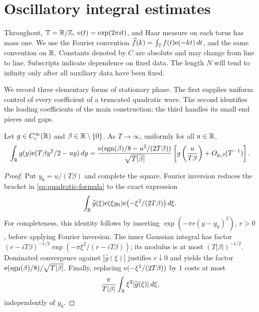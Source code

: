 \section{Oscillatory integral estimates}\label{sec:oscillation}

Throughout, $\mathbb T=\mathbb R/\mathbb Z$, $\mathrm e(t)=\exp(2\pi i t)$, and Haar measure on
each torus has mass one. We use the Fourier convention
$\widehat f(k)=\int_\mathbb T f(t)\mathrm e(-kt)\,dt$, and the same convention on
$\mathbb R$. Constants denoted by $C$ are absolute and may change from line
to line. Subscripts indicate dependence on fixed data. The length
$N$ will tend to infinity only after all auxiliary data have been fixed.

We record three elementary forms of stationary phase. The first supplies
uniform control of every coefficient of a truncated quadratic wave.
The second identifies the leading coefficients of the main construction;
the third handles its small end pieces and gaps.

\begin{lemma}\label{lem:quadratic}
Let $g\in C_c^\infty(\mathbb R)$ and $\beta\in\mathbb R\setminus\{0\}$. As
$T\to\infty$, uniformly for all $u\in\mathbb R$,
\begin{equation}\label{eq:quadratic-formula}
 \int_\mathbb R g(y)\mathrm e(T\beta y^2/2-uy)\,dy
 =\frac{\mathrm e(\operatorname{sgn}(\beta)/8-u^2/(2T\beta))}{\sqrt{T|\beta|}}
   \left[g\left(\frac{u}{T\beta}\right)+O_{g,\beta}(T^{-1})\right].
\end{equation}
\end{lemma}
\begin{proof}
Put $y_0=u/(T\beta)$ and complete the square. Fourier inversion reduces
the bracket in \eqref{eq:quadratic-formula} to the exact expression
\[
 \int_\mathbb R \widehat g(\xi)\mathrm e(\xi y_0)
                     \mathrm e\bigl(-\xi^2/(2T\beta)\bigr)\,d\xi.
\]
For completeness, this identity follows by inserting
$\exp(-\pi r(y-y_0)^2)$, $r>0$, before applying Fourier inversion.
The inner Gaussian integral has factor
$(r-iT\beta)^{-1/2}\exp(-\pi\xi^2/(r-iT\beta))$;
its modulus is at most $(T|\beta|)^{-1/2}$. Dominated convergence
against $|\widehat g(\xi)|$ justifies $r\downarrow0$ and yields the
factor $\mathrm e(\operatorname{sgn}(\beta)/8)/\sqrt{T|\beta|}$.
Finally, replacing $\mathrm e(-\xi^2/(2T\beta))$ by $1$ costs at most
\[
 \frac{\pi}{T|\beta|}\int_\mathbb R \xi^2|\widehat g(\xi)|\,d\xi,
\]
independently of $y_0$.
\end{proof}


